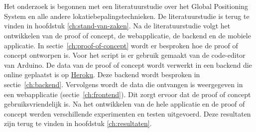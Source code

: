 
\chapter{}
\label{ch:methodologie}

Het onderzoek is begonnen met een literatuurstudie over het Global Positioning System en alle andere lokatiebepalingstechnieken. De literatuurstudie is terug te vinden in hoofdstuk \ref{ch:stand-van-zaken}.
\newline
\newline
Na de literatuurstudie volgt het ontwikkelen van de proof of concept, de webapplicatie, de backend en de mobiele applicatie. In sectie~\ref{ch:proof-of-concept} wordt er besproken hoe de proof of concept ontworpen is. Voor het script is er gebruik gemaakt van de code-editor van Arduino. 
\newline
\newline
De data van de proof of concept wordt verwerkt in een backend die online geplaatst is op \href{www.heroku.com}{Heroku}. Deze backend wordt besproken in sectie~\ref{ch:backend}.
\newline
\newline
Vervolgens wordt de data die ontvangen is weergegeven in een webapplicatie (sectie~\ref{ch:frontend}). Dit zorgt ervoor dat de proof of concept gebruiksvriendelijk is. 
\newline
\newline
Na het ontwikkelen van de hele applicatie en de proof of concept werden verschillende experimenten en testen uitgevoerd. Deze resultaten zijn terug te vinden in hoofdstuk \ref{ch:resultaten}.

